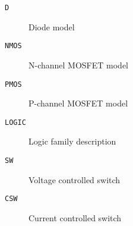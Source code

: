 \begin{description}

\item[{\tt D}] Diode model

\item[{\tt NMOS}] N-channel MOSFET model

\item[{\tt PMOS}] P-channel MOSFET model

\item[{\tt LOGIC}] Logic family description

\item[{\tt SW}] Voltage controlled switch

\item[{\tt CSW}] Current controlled switch

\end{description}

